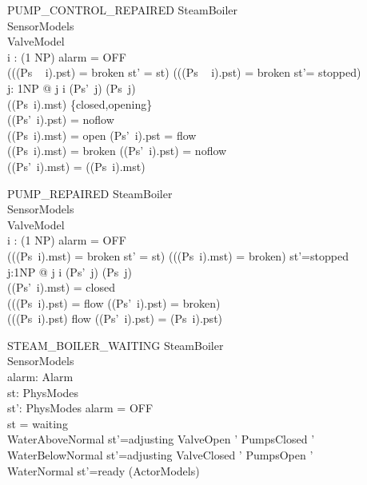 \begin{schema}{PUMP\_CONTROL\_REPAIRED} 
       \Delta SteamBoiler\\ 
       \Xi SensorModels\\
       \Xi ValveModel\\
       i : (1 \upto NP)
\where
       alarm = OFF   \\
       (((Ps ~ i).pst)  = broken  \land st' = st) \lor  
       (\lnot((Ps ~ i).pst) = broken  \land st'= stopped)         \\
       \forall j: 1\upto NP @ j \neq i \implies (Ps'~j) \neq (Ps~j)   \\
       ((Ps~i).mst) \in \{closed,opening\}                    \\
                         \implies ((Ps'~i).pst) = noflow  \\
       ((Ps~i).mst) = open  \implies (Ps'~i).pst = flow   \\
       ((Ps~i).mst) = broken  \implies ((Ps'~i).pst) = noflow  \\
       ((Ps'~i).mst) = ((Ps~i).mst) 
\end{schema}

\begin{schema}{PUMP\_REPAIRED}
         \Delta SteamBoiler\\ 
         \Xi SensorModels\\
         \Xi ValveModel\\
         i : (1 \upto NP)
\where
         alarm = OFF \\
         (((Ps~i).mst)  = broken  \land st' = st) \lor 
         (\lnot((Ps~i).mst) = broken) \land st'=stopped  \\
         \forall j:1\upto NP @ j \neq i \implies (Ps'~j) \neq (Ps~j)   \\
         ((Ps'~i).mst) = closed    \\
         (((Ps~i).pst) = flow \land ((Ps'~i).pst) = broken) \lor \\
         (((Ps~i).pst) \neq flow \land ((Ps'~i).pst) = (Ps~i).pst) 
\end{schema}

\begin{schema}{STEAM\_BOILER\_WAITING}
       \Delta SteamBoiler\\ 
       \Xi SensorModels\\
       alarm: Alarm\\
       st: PhysModes\\
       st': PhysModes
\where
       alarm = OFF  \\
       st = waiting  \\
       WaterAboveNormal \implies st'=adjusting \land ValveOpen '  \land
       PumpsClosed '\\
       WaterBelowNormal \implies st'=adjusting \land ValveClosed '\land
       PumpsOpen '  \\
       WaterNormal      \implies st'=ready     \land (\Xi ActorModels)
\end{schema}

